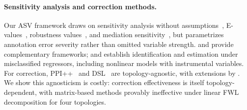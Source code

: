 \paragraph{Sensitivity analysis and correction methods.}
Our ASV framework draws on sensitivity analysis without assumptions~\cite{ding_vanderweele2016}, E-values~\cite{vanderweele_ding2017, mathur2018}, robustness values~\cite{cinelli2020making}, and mediation sensitivity~\cite{imai_keele_yamamoto2010, pryzant_etal2021}, but parametrizes annotation error severity rather than omitted variable strength. \citet{lash2009} and \citet{blackwell_honaker_king2017} provide complementary frameworks; \citet{mahajan2006} and \citet{hu2008} establish identification and estimation under misclassified regressors, including nonlinear models with instrumental variables. For correction, PPI++~\cite{angelopoulos2023} and DSL~\cite{egami_hinck_stewart_wei2023} are topology-agnostic, with extensions by \citet{zrnic_candes2024, demirel2024prediction, cadei2025, gligoric2025}. We show this agnosticism is costly: correction effectiveness is itself topology-dependent, with matrix-based methods provably ineffective under linear FWL decomposition for four topologies.
